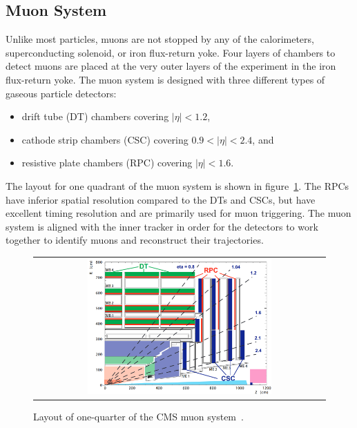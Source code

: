 \subsection{Muon System}
Unlike most particles, muons are not stopped by any of the calorimeters, superconducting solenoid, or iron flux-return yoke. 
Four layers of chambers to detect muons are placed at the very outer layers of the experiment in the iron flux-return yoke. 
The muon system is designed with three different types of gaseous particle detectors: 
\begin{itemize}
\item drift tube (DT) chambers covering $\vert \eta \vert < 1.2$,
\item cathode strip chambers (CSC) covering $0.9 < \vert \eta \vert < 2.4$, and
\item resistive plate chambers (RPC) covering $\vert \eta \vert < 1.6$.
\end{itemize}
The layout for one quadrant of the muon system is shown in figure~\ref{Muon_System}.
The RPCs have inferior spatial resolution compared to the DTs and CSCs, but have excellent timing resolution and are primarily used for muon triggering.
The muon system is aligned with the inner tracker in order for the detectors to work together to identify muons and reconstruct their trajectories.
\begin{figure}[htb]
  \begin{center}
    \begin{tabular}{c}
        \includegraphics[width=0.65\textwidth]{fig_LHC_CMS/Muon_System.png}
    \end{tabular}
    \caption{Layout of one-quarter of the CMS muon system~\cite{Bayatian:922757}.
            }
    \label{Muon_System}
  \end{center}
\end{figure}


